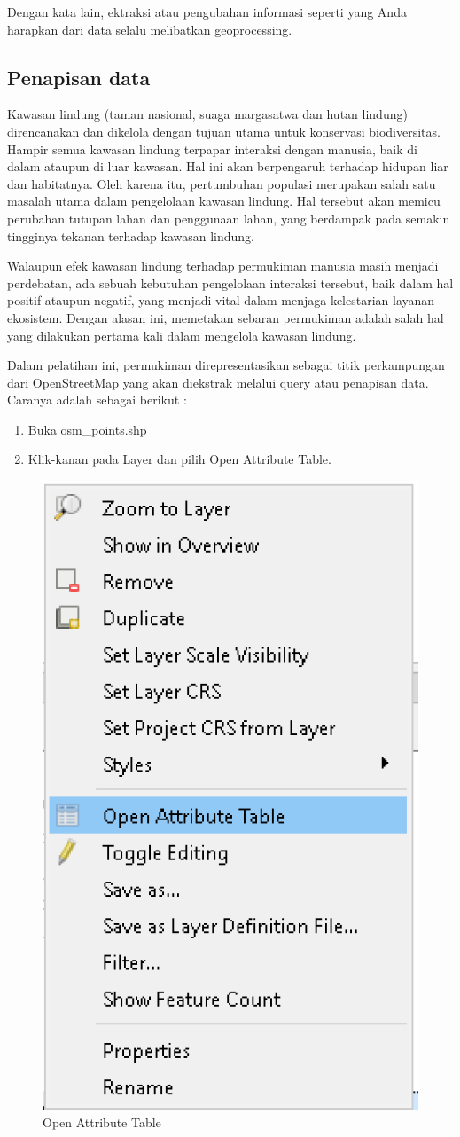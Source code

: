\documentclass[]{book}
\begin{document}
Dengan kata lain, ektraksi atau pengubahan informasi seperti yang Anda harapkan dari data selalu melibatkan geoprocessing.

\hypertarget{penapisan-data}{%
\subsection{Penapisan data}\label{penapisan-data}}

Kawasan lindung (taman nasional, suaga margasatwa dan hutan lindung) direncanakan dan dikelola dengan tujuan utama untuk konservasi biodiversitas. Hampir semua kawasan lindung terpapar interaksi dengan manusia, baik di dalam ataupun di luar kawasan. Hal ini akan berpengaruh terhadap hidupan liar dan habitatnya. Oleh karena itu, pertumbuhan populasi merupakan salah satu masalah utama dalam pengelolaan kawasan lindung. Hal tersebut akan memicu perubahan tutupan lahan dan penggunaan lahan, yang berdampak pada semakin tingginya tekanan terhadap kawasan lindung.

Walaupun efek kawasan lindung terhadap permukiman manusia masih menjadi perdebatan, ada sebuah kebutuhan pengelolaan interaksi tersebut, baik dalam hal positif ataupun negatif, yang menjadi vital dalam menjaga kelestarian layanan ekosistem. Dengan alasan ini, memetakan sebaran permukiman adalah salah hal yang dilakukan pertama kali dalam mengelola kawasan lindung.

Dalam pelatihan ini, permukiman direpresentasikan sebagai titik perkampungan dari OpenStreetMap yang akan diekstrak melalui query atau penapisan data. Caranya adalah sebagai berikut :

\begin{enumerate}
\def\labelenumi{\arabic{enumi}.}
\item
  Buka osm\_points.shp
\item
  Klik-kanan pada Layer dan pilih Open Attribute Table.
\end{enumerate}

\begin{figure}

{\centering \includegraphics[width=0.3\linewidth]{images/04/fig24} 

}

\caption{Open Attribute Table}\label{fig:fig1424}
\end{figure}
\end{document}
